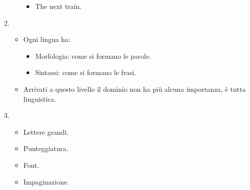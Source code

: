 \begin{enumerate}
\begin{itemize}
\begin{itemize}
          \item The next train.
        \end{itemize}
    \end{itemize}
  \item {}
    \begin{itemize}
      \item Ogni lingua ha: 
        \begin{itemize}
          \item Morfologia: come si formano le parole. 
          \item Sintassi: come si formano le frasi.
        \end{itemize}
      \item Arrivati a questo livello il dominio non ha più alcuna importanza, è tutta linguistica.
    \end{itemize}
  \item {} 
    \begin{itemize}
      \item Lettere grandi. 
      \item Punteggiatura. 
      \item Font. 
      \item Impaginazione.
    \end{itemize}
\end{enumerate}










